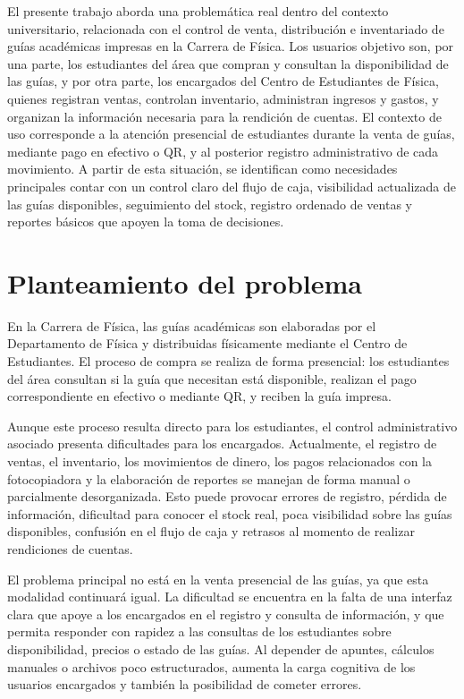 \documentclass[12pt,letterpaper]{article}
\begin{document}
El presente trabajo aborda una problemática real dentro del contexto universitario, relacionada con el control de venta, distribución e inventariado de guías académicas impresas en la Carrera de Física. Los usuarios objetivo son, por una parte, los estudiantes del área que compran y consultan la disponibilidad de las guías, y por otra parte, los encargados del Centro de Estudiantes de Física, quienes registran ventas, controlan inventario, administran ingresos y gastos, y organizan la información necesaria para la rendición de cuentas. El contexto de uso corresponde a la atención presencial de estudiantes durante la venta de guías, mediante pago en efectivo o QR, y al posterior registro administrativo de cada movimiento. A partir de esta situación, se identifican como necesidades principales contar con un control claro del flujo de caja, visibilidad actualizada de las guías disponibles, seguimiento del stock, registro ordenado de ventas y reportes básicos que apoyen la toma de decisiones.

\section{Planteamiento del problema}

En la Carrera de Física, las guías académicas son elaboradas por el Departamento de Física y distribuidas físicamente mediante el Centro de Estudiantes. El proceso de compra se realiza de forma presencial: los estudiantes del área consultan si la guía que necesitan está disponible, realizan el pago correspondiente en efectivo o mediante QR, y reciben la guía impresa.

Aunque este proceso resulta directo para los estudiantes, el control administrativo asociado presenta dificultades para los encargados. Actualmente, el registro de ventas, el inventario, los movimientos de dinero, los pagos relacionados con la fotocopiadora y la elaboración de reportes se manejan de forma manual o parcialmente desorganizada. Esto puede provocar errores de registro, pérdida de información, dificultad para conocer el stock real, poca visibilidad sobre las guías disponibles, confusión en el flujo de caja y retrasos al momento de realizar rendiciones de cuentas.

El problema principal no está en la venta presencial de las guías, ya que esta modalidad continuará igual. La dificultad se encuentra en la falta de una interfaz clara que apoye a los encargados en el registro y consulta de información, y que permita responder con rapidez a las consultas de los estudiantes sobre disponibilidad, precios o estado de las guías. Al depender de apuntes, cálculos manuales o archivos poco estructurados, aumenta la carga cognitiva de los usuarios encargados y también la posibilidad de cometer errores.
\end{document}
